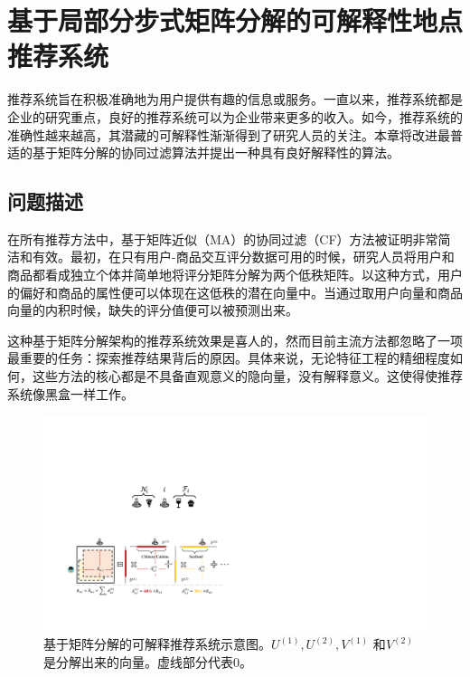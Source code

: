 
\chapter{基于局部分步式矩阵分解的可解释性地点推荐系统}
\label{chapter:main3}

推荐系统旨在积极准确地为用户提供有趣的信息或服务。一直以来，推荐系统都是企业的研究重点，良好的推荐系统可以为企业带来更多的收入。如今，推荐系统的准确性越来越高，其潜藏的可解释性渐渐得到了研究人员的关注。本章将改进最普适的基于矩阵分解的协同过滤算法并提出一种具有良好解释性的算法。

\section{问题描述}
在所有推荐方法中，基于矩阵近似（MA）的协同过滤（CF）方法被证明非常简洁和有效。最初，在只有用户-商品交互评分数据可用的时候，研究人员将用户和商品都看成独立个体并简单地将评分矩阵分解为两个低秩矩阵。以这种方式，用户的偏好和商品的属性便可以体现在这低秩的潜在向量中。当通过取用户向量和商品向量的内积时候，缺失的评分值便可以被预测出来。

这种基于矩阵分解架构的推荐系统效果是喜人的，然而目前主流方法都忽略了一项最重要的任务：探索推荐结果背后的原因。具体来说，无论特征工程的精细程度如何，这些方法的核心都是不具备直观意义的隐向量，没有解释意义。这使得使推荐系统像黑盒一样工作。



\begin{figure}[t!]
\includegraphics[width=\textwidth]{pics/explain.pdf}
\caption{基于矩阵分解的可解释推荐系统示意图。$U^{(1)},U^{(2)},V^{(1)}$ 和$V^{(2)}$ 是分解出来的向量。虚线部分代表0。} 
\label{explain}
\end{figure}

